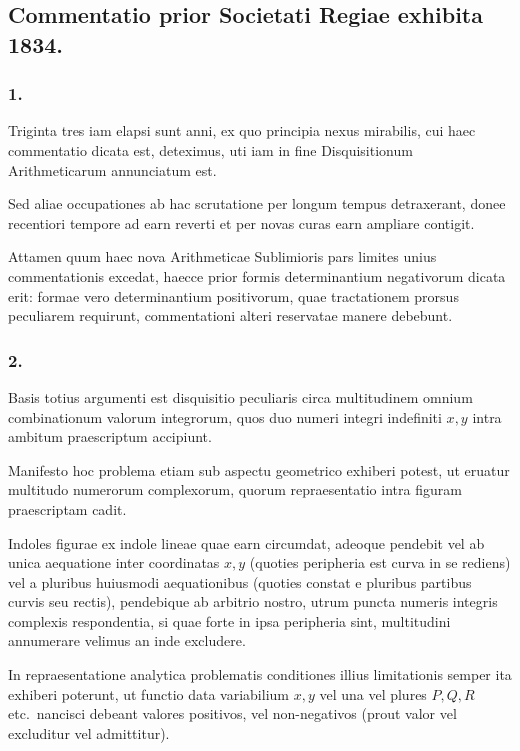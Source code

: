 \documentclass[12pt,a4paper]{article}
\begin{document}
\subsection*{Commentatio prior Societati Regiae exhibita 1834.}

\subsubsection*{1.}

Triginta tres iam elapsi sunt anni, ex quo principia nexus mirabilis, cui haec commentatio dicata est, deteximus, uti iam in fine Disquisitionum Arithmeticarum annunciatum est.

Sed aliae occupationes ab hac scrutatione per longum tempus detraxerant, donee recentiori tempore ad earn reverti et per novas curas earn ampliare contigit.

Attamen quum haec nova Arithmeticae Sublimioris pars limites unius commentationis excedat, haecce prior formis determinantium negativorum dicata erit: formae vero determinantium positivorum, quae tractationem prorsus peculiarem requirunt, commentationi alteri reservatae manere debebunt.

\subsubsection*{2.}

Basis totius argumenti est disquisitio peculiaris circa multitudinem omnium combinationum valorum integrorum, quos duo numeri integri indefiniti $x, y$ intra ambitum praescriptum accipiunt.

Manifesto hoc problema etiam sub aspectu geometrico exhiberi potest, ut eruatur multitudo numerorum complexorum, quorum repraesentatio intra figuram praescriptam cadit.

Indoles figurae ex indole lineae quae earn circumdat, adeoque pendebit vel ab unica aequatione inter coordinatas $x, y$ (quoties peripheria est curva in se rediens) vel a pluribus huiusmodi aequationibus (quoties constat e pluribus partibus curvis seu rectis), pendebique ab arbitrio nostro, utrum puncta numeris integris complexis respondentia, si quae forte in ipsa peripheria sint, multitudini annumerare velimus an inde excludere.

In repraesentatione analytica problematis conditiones illius limitationis semper ita exhiberi poterunt, ut functio data variabilium $x, y$ vel una vel plures $P, Q, R$ etc.\ nancisci debeant valores positivos, vel non-negativos (prout valor vel excluditur vel admittitur).
\end{document}
